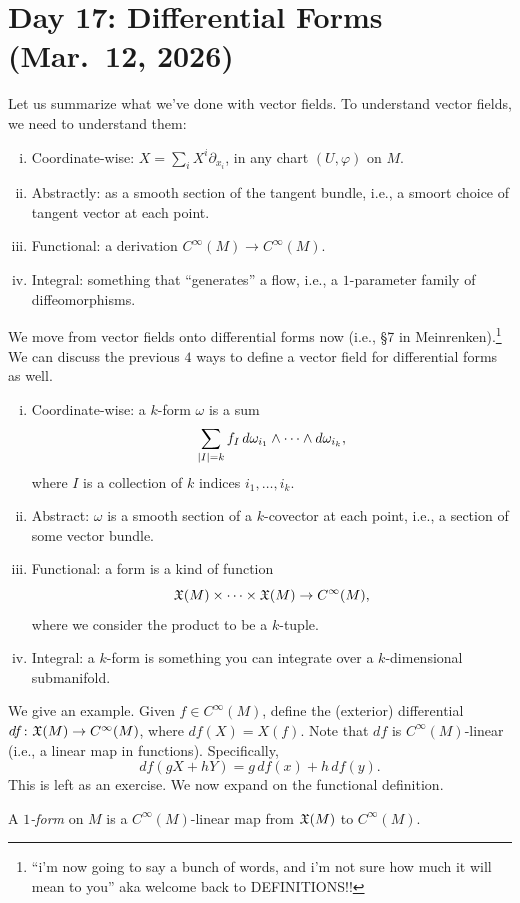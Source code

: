 \section{Day 17: Differential Forms (Mar.\ 12, 2026)}
Let us summarize what we've done with vector fields. To understand vector fields, we need to understand them:
\begin{enumerate}[(i)]
    \item Coordinate-wise: $X = \sum_i X^i \partial_{x_i}$, in any chart $(U, \varphi)$ on $M$.
    \item Abstractly: as a smooth section of the tangent bundle, i.e., a smoort choice of tangent vector at each point.
    \item Functional: a derivation $C^\infty(M) \to C^\infty(M)$.
    \item Integral: something that ``generates'' a flow, i.e., a $1$-parameter family of diffeomorphisms.
\end{enumerate}
We move from vector fields onto differential forms now (i.e., \S7 in Meinrenken).\footnote{``i'm now going to say a bunch of words, and i'm not sure how much it will mean to you'' aka welcome back to DEFINITIONS!!} 
We can discuss the previous $4$ ways to define a vector field for differential forms as well.
\begin{enumerate}[(i)]
    \item Coordinate-wise: a $k$-form $\omega$ is a sum
    \[ \sum_{\left\lvert I \right\rvert = k} f_I \, d\omega_{i_1} \wedge \dots \wedge d\omega_{i_k}, \]
    where $I$ is a collection of $k$ indices $i_1, \dots, i_k$.
    \item Abstract: $\omega$ is a smooth section of a $k$-covector at each point, i.e., a section of some vector bundle.
    \item Functional: a form is a kind of function
    \[ \mathfrak X(M) \times \dots \times \mathfrak X(M) \to C^\infty(M), \]
    where we consider the product to be a $k$-tuple.
    \item Integral: a $k$-form is something you can integrate over a $k$-dimensional submanifold.
\end{enumerate}
We give an example. Given $f \in C^\infty(M)$, define the (exterior) differential $df \colon \mathfrak X(M) \to C^\infty(M)$, where $df(X) = X(f)$. Note that $df$ is $C^\infty(M)$-linear (i.e., a linear map in functions). Specifically,
\[ df(gX + hY) = g \, df(x) + h \, df(y). \]
This is left as an exercise. We now expand on the functional definition.
\begin{definition}[\S7.7]
    A \textit{$1$-form} on $M$ is a $C^\infty(M)$-linear map from $\mathfrak X(M)$ to $C^\infty(M)$.
\end{definition}
